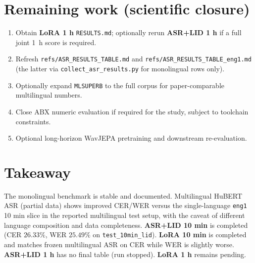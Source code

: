\documentclass[11pt,a4paper]{article}
\begin{document}
\section{Remaining work (scientific closure)}
\begin{enumerate}[leftmargin=*]
    \item Obtain \textbf{LoRA 1 h} \texttt{RESULTS.md}; optionally rerun \textbf{ASR+LID 1 h} if a full joint 1~h score is required.
    \item Refresh \texttt{refs/ASR\_RESULTS\_TABLE.md} and \texttt{refs/ASR\_RESULTS\_TABLE\_eng1.md} (the latter via \texttt{collect\_asr\_results.py} for monolingual rows only).
    \item Optionally expand \texttt{MLSUPERB} to the full corpus for paper-comparable multilingual numbers.
    \item Close ABX numeric evaluation if required for the study, subject to toolchain constraints.
    \item Optional long-horizon WavJEPA pretraining and downstream re-evaluation.
\end{enumerate}

\section{Takeaway}
The monolingual benchmark is stable and documented. Multilingual HuBERT ASR (partial data) shows improved CER/WER versus the single-language \texttt{eng1} 10 min slice in the reported multilingual test setup, with the caveat of different language composition and data completeness. \textbf{ASR+LID 10 min} is completed (CER $26.33\%$, WER $25.49\%$ on \texttt{test\_10min\_lid}). \textbf{LoRA 10 min} is completed and matches frozen multilingual ASR on CER while WER is slightly worse. \textbf{ASR+LID 1 h} has no final table (run stopped). \textbf{LoRA 1 h} remains pending.
\end{document}
